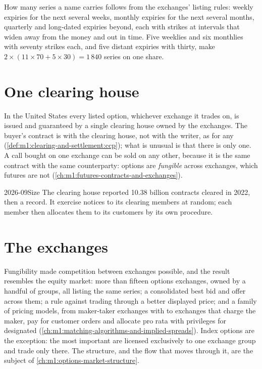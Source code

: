 How many series a name carries follows from the exchanges' listing rules:
weekly expiries for the next several weeks, monthly expiries for the next
several months, quarterly and long-dated expiries beyond, each with strikes
at intervals that widen away from the money and out in time. Five weeklies
and six monthlies with seventy strikes each, and five distant expiries with
thirty, make $2 \times (11 \times 70 + 5 \times 30) = 1\,840$ series on one
share.

\section{One clearing house}

In the United States every listed option, whichever exchange it trades on,
is issued and guaranteed by a single clearing house owned by the exchanges.
The buyer's contract is with the clearing house, not with the writer, as for
any  (\cref{def:m1:clearing-and-settlement:ccp}); what is
unusual is that there is only one. A call bought on one exchange can be sold
on any other, because it is the same contract with the same counterparty:
options are \emph{fungible} across exchanges, which futures are not
(\cref{ch:m1:futures-contracts-and-exchanges}).

\begin{dated}{2026-09}{Size}\label{dat:m1:option-contracts-and-exchanges:occ}
The clearing house reported 10.38 billion contracts cleared in 2022, then a
record. It  exercise notices to its clearing members at random; each
member then allocates them to its customers by its own procedure.
\end{dated}

\section{The exchanges}

Fungibility made competition between exchanges possible, and the result
resembles the equity market: more than fifteen options exchanges, owned by a
handful of groups, all listing the same series; a consolidated best bid and
offer across them; a rule against trading through a better displayed price;
and a family of pricing models, from maker-taker exchanges with  to exchanges that charge the maker, pay for customer orders and
allocate pro rata with privileges for designated 
(\cref{ch:m1:matching-algorithms-and-implied-spreads}). Index options are the
exception: the most important are licensed exclusively to one exchange
group and trade only there. The structure, and the flow that moves through
it, are the subject of \cref{ch:m1:options-market-structure}.

